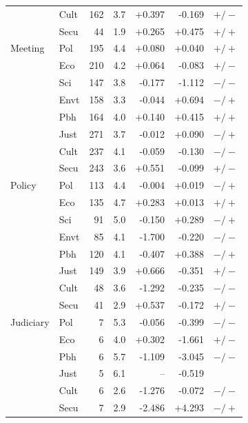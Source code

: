 \begin{table}[h]
\begin{tabular}{@{}l l r r r r l@{}}
 & Cult & 162 & 3.7 & +0.397 & -0.169 & $+/-$ \\
 & Secu & 44 & 1.9 & +0.265 & +0.475 & $+/+$ \\
Meeting & Pol & 195 & 4.4 & +0.080 & +0.040 & $+/+$ \\
 & Eco & 210 & 4.2 & +0.064 & -0.083 & $+/-$ \\
 & Sci & 147 & 3.8 & -0.177 & -1.112 & $-/-$ \\
 & Envt & 158 & 3.3 & -0.044 & +0.694 & $-/+$ \\
 & Pbh & 164 & 4.0 & +0.140 & +0.415 & $+/+$ \\
 & Just & 271 & 3.7 & -0.012 & +0.090 & $-/+$ \\
 & Cult & 237 & 4.1 & -0.059 & -0.130 & $-/-$ \\
 & Secu & 243 & 3.6 & +0.551 & -0.099 & $+/-$ \\
Policy & Pol & 113 & 4.4 & -0.004 & +0.019 & $-/+$ \\
 & Eco & 135 & 4.7 & +0.283 & +0.013 & $+/+$ \\
 & Sci & 91 & 5.0 & -0.150 & +0.289 & $-/+$ \\
 & Envt & 85 & 4.1 & -1.700 & -0.220 & $-/-$ \\
 & Pbh & 120 & 4.1 & -0.407 & +0.388 & $-/+$ \\
 & Just & 149 & 3.9 & +0.666 & -0.351 & $+/-$ \\
 & Cult & 48 & 3.6 & -1.292 & -0.235 & $-/-$ \\
 & Secu & 41 & 2.9 & +0.537 & -0.172 & $+/-$ \\
Judiciary & Pol & 7 & 5.3 & -0.056 & -0.399 & $-/-$ \\
 & Eco & 6 & 4.0 & +0.302 & -1.661 & $+/-$ \\
 & Pbh & 6 & 5.7 & -1.109 & -3.045 & $-/-$ \\
 & Just & 5 & 6.1 & -- & -0.519 &  \\
 & Cult & 6 & 2.6 & -1.276 & -0.072 & $-/-$ \\
 & Secu & 7 & 2.9 & -2.486 & +4.293 & $-/+$ \\
\bottomrule
\end{tabular}
\end{table}